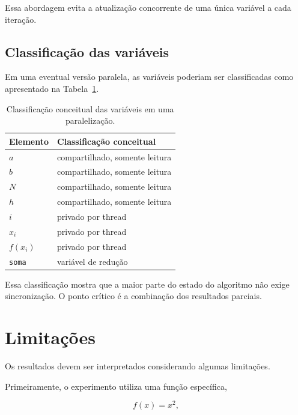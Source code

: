 Essa abordagem evita a atualização concorrente de uma única variável a cada
iteração.

\subsection{Classificação das variáveis}

Em uma eventual versão paralela, as variáveis poderiam ser classificadas
como apresentado na Tabela~\ref{tab:atvd04-variaveis}.

\begin{table}[htbp]
    \centering
    \caption{Classificação conceitual das variáveis em uma paralelização.}
    \label{tab:atvd04-variaveis}

    \begin{tabular}{l|l}
        \hline
        Elemento & Classificação conceitual \\
        \hline
        \(a\) & compartilhado, somente leitura \\
        \(b\) & compartilhado, somente leitura \\
        \(N\) & compartilhado, somente leitura \\
        \(h\) & compartilhado, somente leitura \\
        \(i\) & privado por thread \\
        \(x_i\) & privado por thread \\
        \(f(x_i)\) & privado por thread \\
        \texttt{soma} & variável de redução \\
        \hline
    \end{tabular}
\end{table}

Essa classificação mostra que a maior parte do estado do algoritmo não
exige sincronização. O ponto crítico é a combinação dos resultados
parciais.


\section{Limitações}

\label{sec:atvd04-limitacoes}

Os resultados devem ser interpretados considerando algumas limitações.

Primeiramente, o experimento utiliza uma função específica,

\begin{equation}
    f(x)=x^2,
\end{equation}

